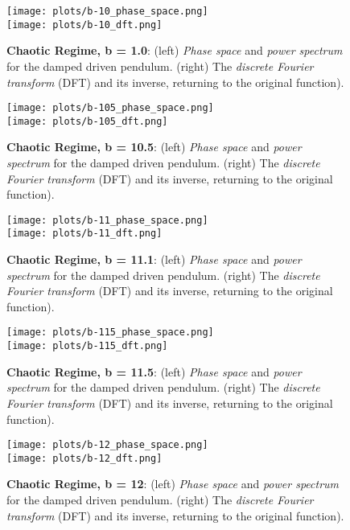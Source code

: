 \documentclass[10pt]{article}
\begin{document}
\begin{figure} [ht]
\begin{center}
\texttt{[image: plots/b-10\_phase\_space.png]} \\
\texttt{[image: plots/b-10\_dft.png]} 
\caption{{\bf Chaotic Regime, b = 1.0}: (left) {\it Phase space} and {\it power spectrum} for the damped driven  pendulum. (right) The {\it discrete Fourier transform} (DFT) and its inverse, returning to the original function).}
\end{center}
\end{figure}

\begin{figure} [ht]
\begin{center}
\texttt{[image: plots/b-105\_phase\_space.png]} \\
\texttt{[image: plots/b-105\_dft.png]} 
\caption{{\bf Chaotic Regime, b = 10.5}: (left) {\it Phase space} and {\it power spectrum} for the damped driven  pendulum. (right) The {\it discrete Fourier transform} (DFT) and its inverse, returning to the original function).}
\end{center}
\end{figure}

\begin{figure} [ht]
\begin{center}
\texttt{[image: plots/b-11\_phase\_space.png]} \\
\texttt{[image: plots/b-11\_dft.png]} 
\caption{{\bf Chaotic Regime, b = 11.1}: (left) {\it Phase space} and {\it power spectrum} for the damped driven  pendulum. (right) The {\it discrete Fourier transform} (DFT) and its inverse, returning to the original function).}
\end{center}
\end{figure}

\begin{figure} [ht]
\begin{center}
\texttt{[image: plots/b-115\_phase\_space.png]} \\
\texttt{[image: plots/b-115\_dft.png]} 
\caption{{\bf Chaotic Regime, b = 11.5}: (left) {\it Phase space} and {\it power spectrum} for the damped driven  pendulum. (right) The {\it discrete Fourier transform} (DFT) and its inverse, returning to the original function).}
\end{center}
\end{figure}

\begin{figure} [ht]
\begin{center}
\texttt{[image: plots/b-12\_phase\_space.png]} \\
\texttt{[image: plots/b-12\_dft.png]} 
\caption{{\bf Chaotic Regime, b = 12}: (left) {\it Phase space} and {\it power spectrum} for the damped driven  pendulum. (right) The {\it discrete Fourier transform} (DFT) and its inverse, returning to the original function).}
\end{center}
\end{figure}
\end{document}
